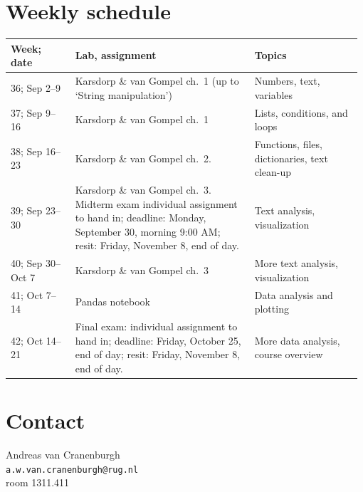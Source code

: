\documentclass[a4paper,12pt]{article}
\begin{document}
\section{Weekly schedule}\label{sectimetable}
{\raggedright
\begin{longtable}{p{0.18\linewidth} p{0.5\linewidth} p{0.3\linewidth} }
Week; date          & Lab, assignment & Topics \\ \midrule

36; Sep 2--9 &
    Karsdorp \& van Gompel ch.\ 1 (up to `String manipulation')
    & Numbers, text, variables
    \\

37; Sep 9--16     &
    Karsdorp \& van Gompel ch.\ 1
    & Lists, conditions, and loops
    \\

38; Sep 16--23    &
    Karsdorp \& van Gompel ch.\ 2.
    & Functions, files, dictionaries, text clean-up
    \\

39; Sep 23--30    &
    Karsdorp \& van Gompel ch.\ 3.
    Midterm exam individual assignment to hand in;
    deadline: Monday, September 30, morning 9:00 AM;
    resit: Friday, November 8, end of day.
    & Text analysis, visualization
    \\

40; Sep 30--Oct 7 &
    Karsdorp \& van Gompel ch.\ 3
    & More text analysis, visualization
    \\

41; Oct 7--14     &
    Pandas notebook
    & Data analysis and plotting
    \\

42; Oct 14--21    &
    Final exam: individual
    assignment to hand in; deadline:
    Friday, October 25, end of day; resit:
    Friday, November 8, end of day.
    & More data analysis, course overview
    \\

\end{longtable}
}

\section{Contact}

Andreas van Cranenburgh\\
\texttt{a.w.van.cranenburgh@rug.nl} \\
room 1311.411
\end{document}
